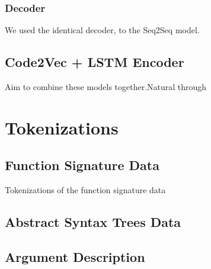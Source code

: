 \subsubsection{Decoder}

We used the identical decoder, to the Seq2Seq model.


\subsection{Code2Vec + LSTM Encoder} %
\label{sub:code2vec_sequence_to_sequence}

Aim to combine these models together.Natural through 











\section{Tokenizations} %
\label{sec:tokenizations}

\subsection{Function Signature Data}

Tokenizations of the function signature data

\subsection{Abstract Syntax Trees Data }


\subsection{Argument Description}










